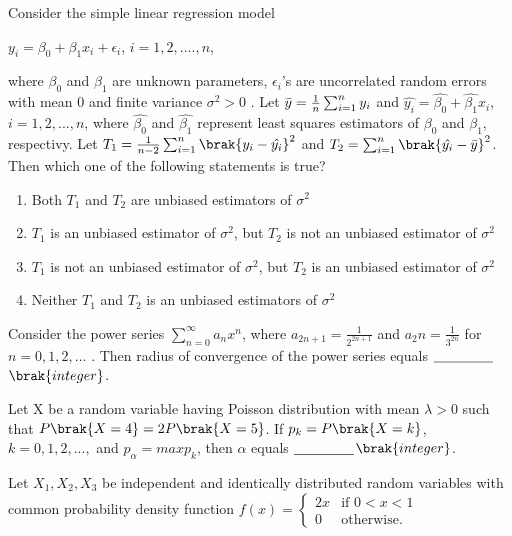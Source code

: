 \item Consider the simple linear regression model 
\begin{center}
    $y_i = {\beta}_0 + {\beta}_1 x_i + {\epsilon}_i$, $i=1,2,....,n$, 
\end{center}
where ${\beta}_0$ and ${\beta}_1$ are unknown parameters, ${\epsilon}_i$'s
 are uncorrelated random errors with mean 0 and finite variance ${\sigma}^2 > 0$ . Let $\Bar{y}= \frac{1}{n}\sum_{i=1}^n y_i$ and $\hat{y_i}=\hat{\beta_0}+\hat{\beta_1}x_i$,$i=1,2,...,n$, where $\hat{\beta_0}$ and $\hat{\beta_1}$ represent least squares estimators of $\beta_0$ and $\beta_1$, respectivy. Let $T_1 = \frac{1}{n-2}\sum_{i=1}^n \brak{y_i -\hat{y_i}}^2$ and $T_2 = \sum_{i=1}^n\brak{\hat{y_i}-\Bar{y}}^2$. Then which one of the following statements is true?
 \begin{enumerate}
     \item Both $T_1$ and $T_2$ are unbiased estimators of $\sigma^2$
     \item $T_1$ is an unbiased estimator of $\sigma^2$, but $T_2$ is not an unbiased estimator of $\sigma^2$
     \item $T_1$ is not an unbiased estimator of $\sigma^2$, but $T_2$ is an unbiased estimator of $\sigma^2$
     \item Neither $T_1$ and $T_2$ is an unbiased estimators of $\sigma^2$
 \end{enumerate}
 \item Consider the power series $\sum_{n=0}^\infty a_n x^n$, where $a_{2n+1}=\frac{1}{2^{2n+1}}$ and $a_2n = \frac{1}{3^{2n}}$ for $n=0,1,2,...$ . Then radius of convergence of the power series equals $\underline{\hspace{1.5 cm}}$$\brak{integer}$.
 \item Let X be a random variable having Poisson distribution with mean $\lambda>0$    such that $P\brak{X=4}=2P\brak{X=5}$. If $p_k = P\brak{X=k}$, $k=0,1,2,...,$ and $p_\alpha = max p_k$, then $\alpha$ equals $\underline{\hspace{1.5 cm}}$$\brak{integer}$.
 \item Let $X_1,X_2,X_3$ be independent and identically distributed random variables with common probability density function 
  $f(x) = 
    \begin{cases} 
        2x & \text{if } 0 < x < 1 \\
        0 & \text{otherwise}.
    \end{cases}
    $
    
